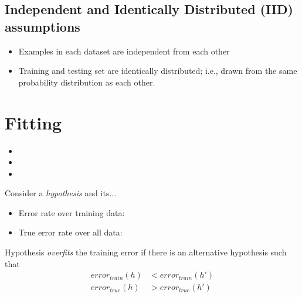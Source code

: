 \documentclass[
	number={1},
	title={Machine Learning Fundamentals}
]{cs584notes}
\begin{document}
\subsection{Independent and Identically Distributed (IID) assumptions}\label{subsec:iid-assumptions}
\begin{itemize}
	\item Examples in each dataset are independent from each other
	\item Training and testing set are identically distributed; i.e., drawn from the same probability distribution as each other.
\end{itemize}

\section{Fitting}\label{sec:fitting}
\begin{itemize}
	\item {}
	\item {}
	\item {}
\end{itemize}

Consider a \emph{hypothesis } and its$\dots$
\begin{itemize}
	\item Error rate over training data: 
	\item True error rate over all data: 
\end{itemize}

Hypothesis  \emph{overfits} the training error if there is an alternative hypothesis  such that
\begin{equation}
\begin{aligned}
	error_{train}(h) &< error_{train}(h')\\
	error_{true}(h) &> error_{true}(h')
\end{aligned}\label{eq:hypothesis}
\end{equation}
\end{document}
